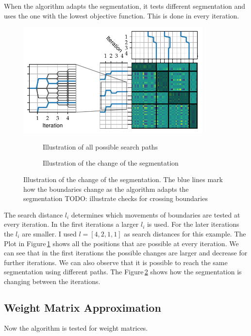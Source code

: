 \documentclass[doctype=mastersthesis,BCOR=15mm,biblatex]{ldvbook}%
\begin{document}
When the algorithm adapts the segmentation, it tests different segmentation and uses the one with the lowest objective function.
This is done in every iteration. 
\begin{figure}[!htb]
	\centering
	\includegraphics[width=0.87\textwidth]{Plots/example_move_iterations.pdf}
	\begin{subfigure}[b]{0.3\textwidth}
		\caption{Illustration of all possible search paths}
		\label{fig:example_move_bound_a}
	\end{subfigure}
	\begin{subfigure}[b]{0.55\textwidth}
		\caption{Illustration of the change of the segmentation}
		\label{fig:example_move_bound_b}
	\end{subfigure}
	\caption{Illustration of the change of the segmentation.
		The blue lines mark how the boundaries change as the algorithm adapts the segmentation TODO: illustrate checks for crossing boundaries
	}
	\label{fig:example_move_bound}
\end{figure}
The search distance $l_i$ determines which movements of boundaries are tested at every iteration.
In the first iterations a larger $l_i$ is used. 
For the later iterations the $l_i$ are smaller.
I used $l = [4,2,1,1]$ as search distances for this example.
The Plot in Figure\,\ref{fig:example_move_bound_a} shows all the positions that are possible at every iteration.
We can see that in the first iterations the possible changes are larger and decrease for further iterations.
We can also observe that it is possible to reach the same segmentation using different paths.
The Figure\,\ref{fig:example_move_bound_b} shows how the segmentation is changing between the iterations. 


\subsection{Weight Matrix Approximation}
Now the algorithm is tested for weight matrices.
\end{document}
